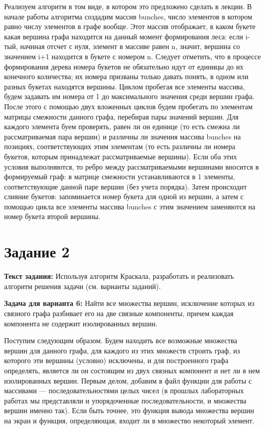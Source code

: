 \documentclass[12pt]{article}
\begin{document}
	Реализуем алгоритм в том виде, в котором это предложено сделать в лекции. В начале работы алгоритма создадим массив bunches, число элементов в котором равно числу элементов в графе вообще. Этот массив отображает, в каком букете какая вершина графа находится на данный момент формирования леса: если i-тый, начиная отсчет с нуля, элемент в массиве равен n, значит, вершина со значением i+1 находится в букете с номером n. Следует отметить, что в процессе формирования дерева номера букетов не обязательно идут от единицы до их конечного количества; их номера призваны только давать понять, в одном или разных букетах находятся вершины. Циклом пробегая все элементы массива, будем задавать им номера от 1 до максимального значения среди вершин графа. После этого с помощью двух вложенных циклов будем пробегать по элементам матрицы смежности данного графа, перебирая пары значений вершин. Для каждого элемента буем проверять, равен ли он единице (то есть смежна ли рассматриваемая пара вершин) и различны ли значения массива bunches на позициях, соответствующих этим элементам (то есть различны ли номера букетов, которым принадлежат рассматриваемые вершины). Если оба этих условия выполняются, то ребро между рассматриваемыми вершинами вносится в формируемый граф: в матрице смежности устанавливаются в 1 элементы, соответствующие данной паре вершин (без учета порядка). Затем происходит слияние букетов: запоминается номер букета для одной из вершин, а затем с помощью цикла все элементы массива bunches с этим значением заменяются на номер букета второй вершины.
	
	 
	
	\section{Задание 2}
	\label{task2}
	
	{\bf Текст задания:} Используя алгоритм Краскала, разработать и реализовать алгоритм решения задачи (см. варианты заданий).
	
	{\bf Задача для варианта 6: } Найти все множества вершин, исключение которых из связного графа разбивает его на две связные компоненты, причем каждая компонента не содержит изолированных вершин.
	
	Поступим следующим образом. Будем находить все возможные множества вершин для данного графа, для каждого из этих множеств строить граф, из которого эти вершины (условно) исключены, и для построенного графа определять, является ли он состоящим из двух связных компонент и нет ли в нем изолированных вершин. Первым делом, добавим в файл функции для работы с массивами --- последовательностями целых чисел (в прошлых лабораторных работах мы представляли и упорядоченные последовательности, и множества вершин именно так). Если быть точнее, это функция вывода множества вершин на экран и функция, определяющая, входит ли в множество некоторый элемент.
	
\end{document}
